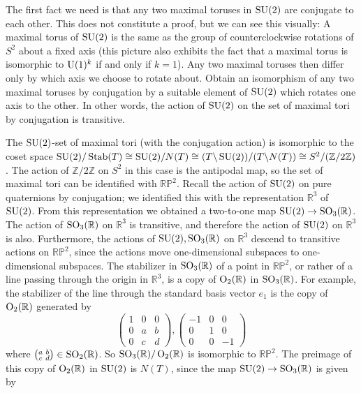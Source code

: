 \documentclass[../../rtnotes.tex]{subfiles}
\begin{document}
The first fact we need is that any two maximal toruses in $\operatorname{SU}(2)$ are conjugate to each other. This does not constitute a proof, but we can see this visually:  A maximal torus of $\operatorname{SU}(2)$ is the same as the group of counterclockwise rotations of $S^2$ about a fixed axis (this picture also exhibits the fact that a maximal torus is isomorphic to $\operatorname{U}(1)^k$ if and only if $k = 1$). Any two maximal toruses then differ only by which axis we choose to rotate about. Obtain an isomorphism of any two maximal toruses by conjugation by a suitable element of $\operatorname{SU}(2)$ which rotates one axis to the other. In other words, the action of $\operatorname{SU}(2)$ on the set of maximal tori by conjugation is transitive. 

The $\operatorname{SU}(2)$-set of maximal tori (with the conjugation action) is isomorphic to the coset space $\operatorname{SU}(2)/\operatorname{Stab}(T)\cong \operatorname{SU}(2)/N(T)\cong (T\backslash \operatorname{SU}(2))/(T\backslash N(T))\cong S^2/(\mathbb Z/2\mathbb Z)$. The action of $\mathbb Z/2\mathbb Z$ on $S^2$ in this case is the antipodal map, so the set of maximal tori can be identified with $\mathbb{RP}^2$. Recall the action of $\operatorname{SU}(2)$ on pure quaternions by conjugation; we identified this with the representation $\mathbb R^3$ of $\operatorname{SU}(2)$. From this representation we obtained a two-to-one map $\operatorname{SU}(2)\to\operatorname{SO}_3(\mathbb R)$. The action of $\operatorname{SO}_3(\mathbb R)$ on $\mathbb R^3$ is transitive, and therefore the action of $\operatorname{SU}(2)$ on $\mathbb R^3$ is also. Furthermore, the actions of $\operatorname{SU}(2),\operatorname{SO}_3(\mathbb R)$ on $\mathbb R^3$ descend to transitive actions on $\mathbb{RP}^2$, since the actions move one-dimensional subspaces to one-dimensional subspaces. The stabilizer in $\operatorname{SO}_3(\mathbb R)$ of a point in $\mathbb{RP}^2$, or rather of a line passing through the origin in $\mathbb R^3$, is a copy of $\operatorname{O}_2(\mathbb R)$ in $\operatorname{SO}_3(\mathbb R)$. For example, the stabilizer of the line through the standard basis vector $e_1$ is the copy of $\operatorname{O}_2(\mathbb R)$ generated by 
\[\begin{pmatrix}
    1 & 0 & 0 \\
    0 & a & b \\
    0 & c & d
\end{pmatrix}, \begin{pmatrix}
    -1 & 0 & 0 \\
    0 & 1 & 0 \\
    0 & 0 & -1
\end{pmatrix}\]
where $\bigl(\!\begin{smallmatrix}
    a & b \\ c & d
\end{smallmatrix}\!\bigr)\in \operatorname{SO}_2(\mathbb R)$. So $\operatorname{SO}_3(\mathbb R)/\operatorname{O}_2(\mathbb R)$ is isomorphic to $\mathbb{RP}^2$. The preimage of this copy of $\operatorname{O}_2(\mathbb R)$ in $\operatorname{SU}(2)$ is $N(T)$, since the map $\operatorname{SU}(2)\to\operatorname{SO}_3(\mathbb R)$ is given by 
\end{document}

